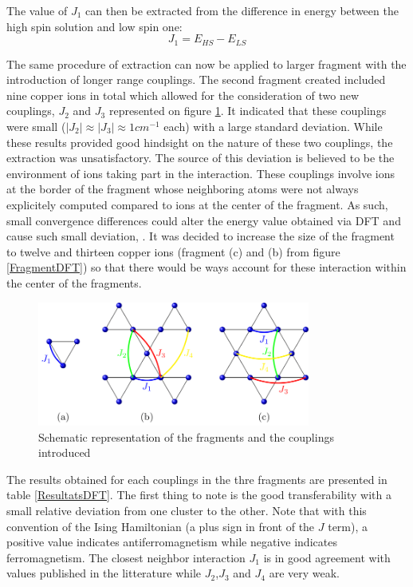 \documentclass[10pt]{report}
\numberwithin{equation}{section}
\begin{document}
The value of $J_1$ can then be extracted from the difference in energy between the high spin solution and low spin one:
\begin{equation}
    J_1=E_{HS}-E_{LS}
\end{equation}

The same procedure of extraction can now be applied to larger fragment with the introduction of longer range couplings.
The second fragment created included nine copper ions in total which allowed for the consideration of two new couplings, $J_2$ and $J_3$ represented on figure \ref{CouplageDFT}.
It indicated that these couplings were small ($|J_{2}|\approx |J_{3}|\approx1 cm^{-1}$ each) with a large standard deviation.
While these results provided good hindsight on the nature of these two couplings, the extraction was unsatisfactory.
The source of this deviation is believed to be the environment of ions taking part in the interaction. 
These couplings involve ions at the border of the fragment whose neighboring atoms were not always explicitely computed compared to ions at the center of the fragment.
As such, small convergence differences could alter the energy value obtained via DFT and cause such small deviation,  .
It was decided to increase the size of the fragment to twelve and thirteen copper ions (fragment (c) and (b) from figure \ref{FragmentDFT}) so that there would be ways account for these interaction within the center of the fragments.


\begin{figure}[h!]
    \centering
    \includegraphics[width=0.8\textwidth]{Images/ModeleDFT_plan.png}
    \caption{Schematic representation of the fragments and the couplings introduced}
    \label{CouplageDFT}
\end{figure}

The results obtained for each couplings in the thre fragments are presented in table \ref{ResultatsDFT}.
The first thing to note is the good transferability with a small relative deviation from one cluster to the other.
Note that with this convention of the Ising Hamiltonian (a plus sign in front of the $J$ term), a positive value indicates antiferromagnetism while negative indicates ferromagnetism.
The closest neighbor interaction $J_1$ is in good agreement with values published in the litterature while $J_2$,$J_3$ and $J_4$ are very weak. 
\end{document}
